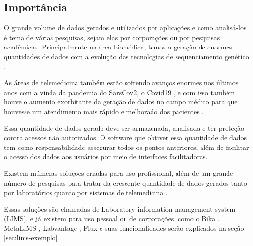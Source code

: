 \subsection{Importância}


O grande volume de dados gerados e utilizados por aplicações e como analisá-los é tema de várias pesquisas, sejam elas por corporações ou por pesquisas acadêmicas. Principalmente na área biomédica, temos a geração de enormes quantidades de dados com a evolução das tecnologias de sequenciamento genético \cite{luoJ2016}.

As áreas de telemedicina também estão sofrendo avanços enormes nos últimos anos com a vinda da pandemia do SarsCov2, o Covid19 \cite{bakhtiar2020, kronenfeld2021, GatesB.Colbert2020UtilityEra}, e com isso também houve o aumento exorbitante da geração de dados no campo médico para que houvesse um atendimento mais rápido e melhorado dos pacientes \cite{MohdKhanapiAbdGhani2018PDFData, Coakley2015TransformingAnalytics}.

Essa quantidade de dados gerado deve ser armazenada, analisada e ter proteção contra acessos não autorizados. O software que obtiver essa quantidade de dados tem como responsabilidade assegurar todos os pontos anteriores, além de facilitar o acesso dos dados aos usuários por meio de interfaces facilitadoras.

Existem inúmeras soluções criadas para uso profissional, além de um grande número de pesquisas para tratar da crescente quantidade de dados gerados tanto por laboratórios quanto por sistemas de telemedicina \cite{Mangrulkar2022AutomaticTechniques}.

Essas soluções são chamadas de Laboratory information management system (LIMS), e já existem para uso pessoal ou de corporações, como o Bika \cite{Goodblatt2006FosteringProcess}, MetaLIMS \cite{Heinle2017MetaLIMSLabs}, Labvantage \cite{Smallmon2017BiobankingSilos}, Flux \cite{Melo2010SIGLa:Laboratories} e suas funcionalidades serão explicados na seção \ref{sec:lims-exemplo}


